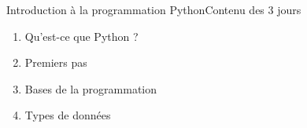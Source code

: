 \documentclass{beamer}
\begin{document}
    \begin{frame}{Introduction à la programmation Python}{Contenu des 3 jours}
        \begin{multicols}{3}
            \begin{tiny}
                \begin{enumerate}
                    \item Qu'est-ce que Python ?
                    \item Premiers pas
                    \begin{itemize}
                    \end{itemize}

                    \item Bases de la programmation
                    \begin{itemize}
                    \end{itemize}

                    \item Types de données
                    \begin{itemize}
                    \end{itemize}


\end{enumerate}
\end{tiny}
\end{multicols}
\end{frame}
\end{document}

